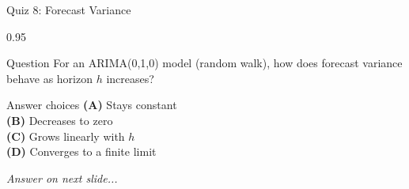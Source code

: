 \documentclass[9pt, aspectratio=169, t]{beamer}
\begin{document}
\begin{frame}{Quiz 8: Forecast Variance}
    \begin{cminipage}{0.95\textwidth}
    \begin{alertblock}{Question}
        For an ARIMA(0,1,0) model (random walk), how does forecast variance behave as horizon $h$ increases?
    \end{alertblock}

    \vspace{0.4cm}

    \begin{block}{Answer choices}
        \textcolor{MainBlue}{\textbf{(A)}} Stays constant\\[3pt]
        \textcolor{MainBlue}{\textbf{(B)}} Decreases to zero\\[3pt]
        \textcolor{MainBlue}{\textbf{(C)}} Grows linearly with $h$\\[3pt]
        \textcolor{MainBlue}{\textbf{(D)}} Converges to a finite limit
    \end{block}

    \vspace{0.5cm}

    \begin{center}
        \textit{Answer on next slide...}
    \end{center}
    \end{cminipage}
\end{frame}
\end{document}
